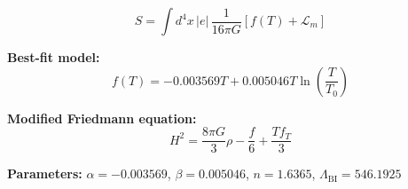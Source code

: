 
\begin{equation}
  S = \int d^4x \, |e| \, \frac{1}{16\pi G} \left[ f(T) + \mathcal{L}_m \right]
\end{equation}

\textbf{Best-fit model:}
\begin{equation}
  f(T) = -0.003569 T + 0.005046 T \ln\!\left(\frac{T}{T_0}\right)
\end{equation}

\textbf{Modified Friedmann equation:}
\begin{equation}
  H^2 = \frac{8\pi G}{3} \rho - \frac{f}{6} + \frac{T f_T}{3}
\end{equation}

\textbf{Parameters:}
$\alpha = -0.003569$, \quad
$\beta = 0.005046$, \quad
$n = 1.6365$, \quad
$\Lambda_{\text{BI}} = 546.1925$